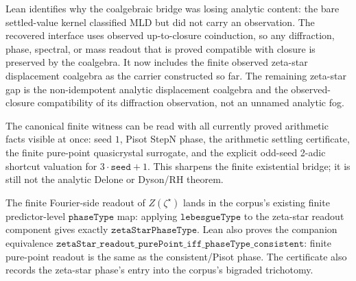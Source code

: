 \begin{theorem}
  \label{thm:zeta-star-analytic-richness-recovery}
  \leanok
  Lean identifies why the coalgebraic bridge was losing analytic content: the
  bare settled-value kernel classified MLD but did not carry an observation.
  The recovered interface uses observed up-to-closure coinduction, so any
  diffraction, phase, spectral, or mass readout that is proved compatible with
  closure is preserved by the coalgebra.  It now includes the finite observed
  zeta-star displacement coalgebra as the carrier constructed so far.  The remaining
  zeta-star gap is the non-idempotent analytic displacement coalgebra and the
  observed-closure compatibility of its diffraction observation, not an unnamed
  analytic fog.
\end{theorem}

\begin{theorem}
  \label{thm:exists-zeta-star-arithmetic-odd-shortcut}
  \leanok
  The canonical finite witness can be read with all currently proved arithmetic
  facts visible at once: seed \(1\), Pisot StepN phase, the arithmetic
  settling certificate, the finite pure-point quasicrystal surrogate, and the
  explicit odd-seed 2-adic shortcut valuation for \(3\cdot\texttt{seed}+1\).
  This sharpens the finite existential bridge; it is still not the analytic
  Delone or Dyson/RH theorem.
\end{theorem}

\begin{theorem}
  \label{thm:zeta-star-finite-phase-type}
  \leanok
  The finite Fourier-side readout of \(Z(\zeta^\star)\) lands in the corpus's
  existing finite predictor-level \(\texttt{phaseType}\) map: applying
  \(\texttt{lebesgueType}\) to the zeta-star readout component gives exactly
  \(\texttt{zetaStarPhaseType}\).  Lean also proves the companion equivalence
  \(\texttt{zetaStar\_readout\_purePoint\_iff\_phaseType\_consistent}\):
  finite pure-point readout is the same as the consistent/Pisot phase.  The
  certificate also records the zeta-star phase's entry into the corpus's
  bigraded trichotomy.
\end{theorem}

